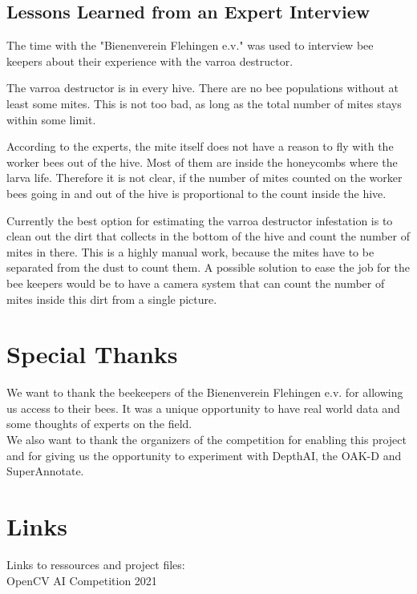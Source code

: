 \documentclass[a4paper,titlepage]{article}
\begin{document}
\subsection{Lessons Learned from an Expert Interview}

The time with the "Bienenverein Flehingen e.v." was used to interview bee keepers about their experience with the varroa destructor.

The varroa destructor is in every hive.
There are no bee populations without at least some mites.
This is not too bad, as long as the total number of mites stays within some limit.

According to the experts, the mite itself does not have a reason to fly with the worker bees out of the hive.
Most of them are inside the honeycombs where the larva life.
Therefore it is not clear, if the number of mites counted on the worker bees going in and out of the hive is proportional to the count inside the hive.

Currently the best option for estimating the varroa destructor infestation is to clean out the dirt that collects in the bottom of the hive and count the number of mites in there.
This is a highly manual work, because the mites have to be separated from the dust to count them.
A possible solution to ease the job for the bee keepers would be to have a camera system that can count the number of mites inside this dirt from a single picture.

\newpage
\section{Special Thanks}

We want to thank the beekeepers of the Bienenverein Flehingen e.v. for allowing us access to their bees.
It was a unique opportunity to have real world data and some thoughts of experts on the field.\\

We also want to thank the organizers of the competition for enabling this project and for giving us the opportunity to experiment with DepthAI, the OAK-D and SuperAnnotate.

\newpage
\section{Links}

Links to ressources and project files: \\

OpenCV AI Competition 2021
\end{document}
